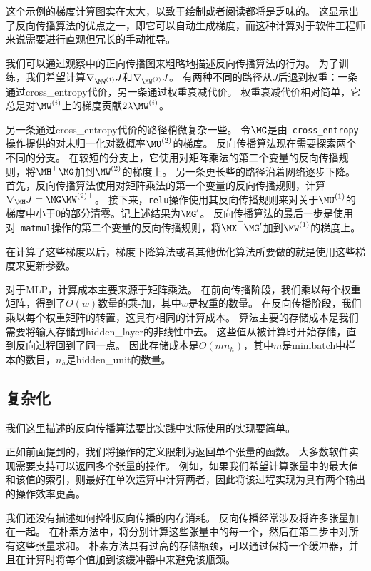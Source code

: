 这个示例的梯度计算图实在太大，以致于绘制或者阅读都将是乏味的。
这显示出了反向传播算法的优点之一，即它可以自动生成梯度，而这种计算对于软件工程师来说需要进行直观但冗长的手动推导。

我们可以通过观察中的正向传播图来粗略地描述反向传播算法的行为。
为了训练，我们希望计算$\nabla_{\MW^{(1)}} J$和$\nabla_{\MW^{(2)}} J$。
有两种不同的路径从$J$后退到权重：一条通过\gls{cross_entropy}代价，另一条通过权重衰减代价。
权重衰减代价相对简单，它总是对$\MW^{(i)}$上的梯度贡献$2\lambda \MW^{(i)}$。
  
  
另一条通过\gls{cross_entropy}代价的路径稍微复杂一些。
令$\MG$是由~\verb|cross_entropy|操作提供的对未归一化对数概率$\MU^{(2)}$的梯度。
反向传播算法现在需要探索两个不同的分支。
在较短的分支上，它使用对矩阵乘法的第二个变量的反向传播规则，将$\MH^\top \MG$加到$\MW^{(2)}$的梯度上。
另一条更长些的路径沿着网络逐步下降。
首先，反向传播算法使用对矩阵乘法的第一个变量的反向传播规则，计算$\nabla_{\MH} J = \MG\MW^{(2)\top}$。
接下来，\verb|relu|操作使用其反向传播规则来对关于$\MU^{(1)}$的梯度中小于0的部分清零。记上述结果为$\MG'$。 
反向传播算法的最后一步是使用对~\verb|matmul|操作的第二个变量的反向传播规则，将$\MX^\top \MG'$加到$\MW^{(1)}$的梯度上。

在计算了这些梯度以后，梯度下降算法或者其他优化算法所要做的就是使用这些梯度来更新参数。

对于MLP，计算成本主要来源于矩阵乘法。
在前向传播阶段，我们乘以每个权重矩阵，得到了$O(w)$数量的乘-加，其中$w$是权重的数量。
在反向传播阶段，我们乘以每个权重矩阵的转置，这具有相同的计算成本。
算法主要的存储成本是我们需要将输入存储到\gls{hidden_layer}的非线性中去。
这些值从被计算时开始存储，直到反向过程回到了同一点。
因此存储成本是$O(mn_h)$，其中$m$是\gls{minibatch}中样本的数目，$n_h$是\gls{hidden_unit}的数量。
  
  
\subsection{复杂化}
\label{sec:complications}

我们这里描述的反向传播算法要比实践中实际使用的实现要简单。

正如前面提到的，我们将操作的定义限制为返回单个张量的函数。
大多数软件实现需要支持可以返回多个张量的操作。 
例如，如果我们希望计算张量中的最大值和该值的索引，则最好在单次运算中计算两者，因此将该过程实现为具有两个输出的操作效率更高。

我们还没有描述如何控制反向传播的内存消耗。
反向传播经常涉及将许多张量加在一起。
在朴素方法中，将分别计算这些张量中的每一个，然后在第二步中对所有这些张量求和。 
朴素方法具有过高的存储瓶颈，可以通过保持一个缓冲器，并且在计算时将每个值加到该缓冲器中来避免该瓶颈。

